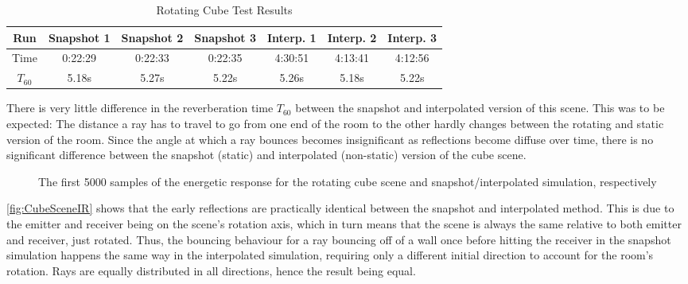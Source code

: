 \begin{table}[t!]
    \centering
    \begin{tabular}{| c | c | c | c | c | c | c |}
        \hline
        Run        & Snapshot 1 & Snapshot 2 & Snapshot 3 & Interp. 1 & Interp. 2 & Interp. 3 \\
        \hline
        Time       & 0:22:29    & 0:22:33    & 0:22:35    & 4:30:51   & 4:13:41   & 4:12:56   \\
        \hline
        \(T_{60}\) & 5.18s      & 5.27s      & 5.22s      & 5.26s     & 5.18s     & 5.22s     \\
        \hline
    \end{tabular}
    \caption{Rotating Cube Test Results}\label{tbl:CubeSceneTable}
\end{table}
There is very little difference in the reverberation time \(T_{60}\) between the snapshot and interpolated version of this scene.
This was to be expected:
The distance a ray has to travel to go from one end of the room to the other hardly changes between the rotating and static version of the room.
Since the angle at which a ray bounces becomes insignificant as reflections become diffuse over time,
there is no significant difference between the snapshot (static) and interpolated (non-static) version of the cube scene.
\newline
\begin{figure}[t!]
    \begin{center}
        
    \end{center}
    \caption{The first 5000 samples of the energetic response for the rotating cube scene and snapshot/interpolated simulation, respectively}\label{fig:CubeSceneIR}
\end{figure}
\autoref{fig:CubeSceneIR} shows that the early reflections are practically identical between the snapshot and interpolated method.
This is due to the emitter and receiver being on the scene's rotation axis,
which in turn means that the scene is always the same relative to both emitter and receiver, just rotated.
\newline
Thus, the bouncing behaviour for a ray bouncing off of a wall once before hitting the receiver
in the snapshot simulation happens the same way in the interpolated simulation,
requiring only a different initial direction to account for the room's rotation.
Rays are equally distributed in all directions, hence the result being equal.
\newline
